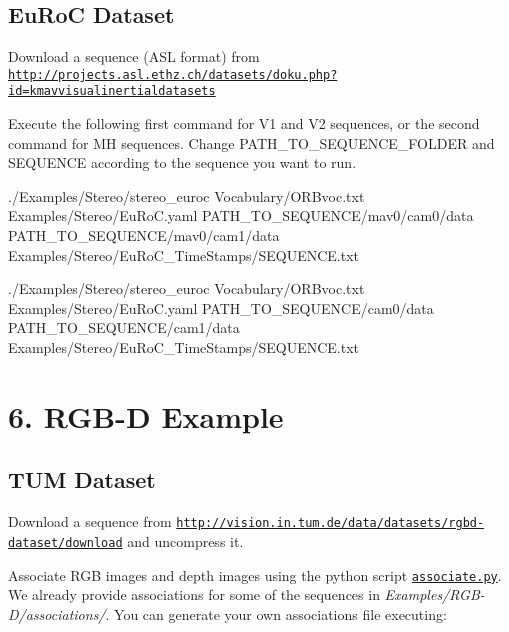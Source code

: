 \subsection*{Eu\+RoC Dataset}


\begin{DoxyEnumerate}
\item Download a sequence (A\+SL format) from \href{http://projects.asl.ethz.ch/datasets/doku.php?id=kmavvisualinertialdatasets}{\tt http\+://projects.\+asl.\+ethz.\+ch/datasets/doku.\+php?id=kmavvisualinertialdatasets}
\item Execute the following first command for V1 and V2 sequences, or the second command for MH sequences. Change P\+A\+T\+H\+\_\+\+T\+O\+\_\+\+S\+E\+Q\+U\+E\+N\+C\+E\+\_\+\+F\+O\+L\+D\+ER and S\+E\+Q\+U\+E\+N\+CE according to the sequence you want to run. 
\begin{DoxyCode}
./Examples/Stereo/stereo\_euroc Vocabulary/ORBvoc.txt Examples/Stereo/EuRoC.yaml
       PATH\_TO\_SEQUENCE/mav0/cam0/data PATH\_TO\_SEQUENCE/mav0/cam1/data Examples/Stereo/EuRoC\_TimeStamps/SEQUENCE.txt
\end{DoxyCode}
 
\begin{DoxyCode}
./Examples/Stereo/stereo\_euroc Vocabulary/ORBvoc.txt Examples/Stereo/EuRoC.yaml PATH\_TO\_SEQUENCE/cam0/data
       PATH\_TO\_SEQUENCE/cam1/data Examples/Stereo/EuRoC\_TimeStamps/SEQUENCE.txt
\end{DoxyCode}

\end{DoxyEnumerate}

\section*{6. R\+G\+B-\/D Example}

\subsection*{T\+UM Dataset}


\begin{DoxyEnumerate}
\item Download a sequence from \href{http://vision.in.tum.de/data/datasets/rgbd-dataset/download}{\tt http\+://vision.\+in.\+tum.\+de/data/datasets/rgbd-\/dataset/download} and uncompress it.
\item Associate R\+GB images and depth images using the python script \href{http://vision.in.tum.de/data/datasets/rgbd-dataset/tools}{\tt associate.\+py}. We already provide associations for some of the sequences in {\itshape Examples/\+R\+G\+B-\/\+D/associations/}. You can generate your own associations file executing\+:
\end{DoxyEnumerate}


